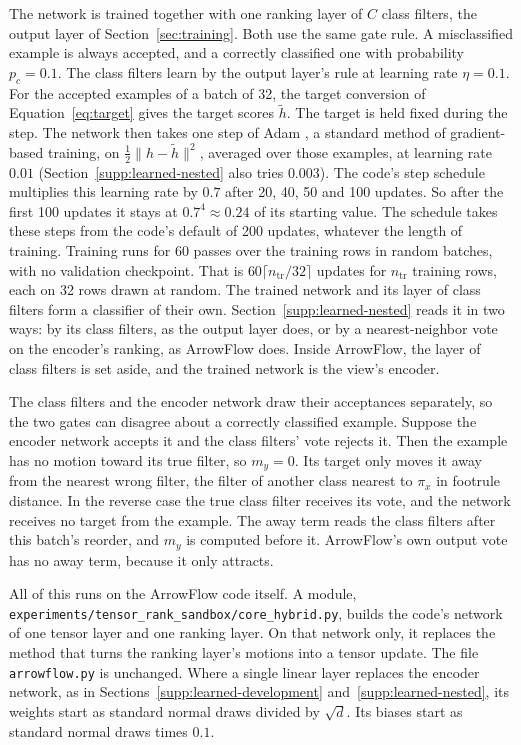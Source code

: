 The network is trained together with one ranking layer of $C$ class filters, the output layer of Section~\ref{sec:training}. Both use the same gate rule. A misclassified example is always accepted, and a correctly classified one with probability $p_c=0.1$. The class filters learn by the output layer's rule at learning rate $\eta=0.1$. For the accepted examples of a batch of 32, the target conversion of Equation~\eqref{eq:target} gives the target scores $\tilde h$. The target is held fixed during the step. The network then takes one step of Adam \citep{kingma2015adam}, a standard method of gradient-based training, on $\tfrac12\lVert h-\tilde h\rVert^2$, averaged over those examples, at learning rate $0.01$ (Section~\ref{supp:learned-nested} also tries $0.003$). The code's step schedule multiplies this learning rate by $0.7$ after 20, 40, 50 and 100 updates. So after the first 100 updates it stays at $0.7^4\approx0.24$ of its starting value. The schedule takes these steps from the code's default of 200 updates, whatever the length of training. Training runs for 60 passes over the training rows in random batches, with no validation checkpoint. That is $60\lceil n_{\mathrm{tr}}/32\rceil$ updates for $n_{\mathrm{tr}}$ training rows, each on 32 rows drawn at random. The trained network and its layer of class filters form a classifier of their own. Section~\ref{supp:learned-nested} reads it in two ways: by its class filters, as the output layer does, or by a nearest-neighbor vote on the encoder's ranking, as ArrowFlow does. Inside ArrowFlow, the layer of class filters is set aside, and the trained network is the view's encoder.

The class filters and the encoder network draw their acceptances separately, so the two gates can disagree about a correctly classified example. Suppose the encoder network accepts it and the class filters' vote rejects it. Then the example has no motion toward its true filter, so $m_y=0$. Its target only moves it away from the nearest wrong filter, the filter of another class nearest to $\pi_x$ in footrule distance. In the reverse case the true class filter receives its vote, and the network receives no target from the example. The away term reads the class filters after this batch's reorder, and $m_y$ is computed before it. ArrowFlow's own output vote has no away term, because it only attracts.

All of this runs on the ArrowFlow code itself. A module, \nolinkurl{experiments/tensor_rank_sandbox/core_hybrid.py}, builds the code's network of one tensor layer and one ranking layer. On that network only, it replaces the method that turns the ranking layer's motions into a tensor update. The file \texttt{arrowflow.py} is unchanged. Where a single linear layer replaces the encoder network, as in Sections~\ref{supp:learned-development} and~\ref{supp:learned-nested}, its weights start as standard normal draws divided by $\sqrt d$. Its biases start as standard normal draws times $0.1$.


